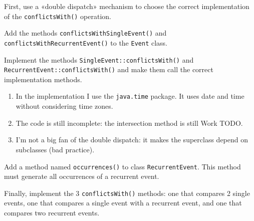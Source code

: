 \documentclass[a4paper,11pt]{memoir}
\newcommand{\code}[1]{\lstinline{#1}}
\begin{document}
\begin{exercise}
	First, use a «double dispatch» mechanism to choose the correct implementation of the \code{conflictsWith()} operation.
	
	\begin{inparaenum}[(A)]
		\item Add the methods \code{conflictsWithSingleEvent()} and \code{conflictsWithRecurrentEvent()} to the \code{Event} class.
		\item Implement the methods \code{SingleEvent::conflictsWith()} and \code{RecurrentEvent::conflictsWith()} and make them call the correct implementation methods.
	\end{inparaenum}
\end{exercise}

\begin{solution}
\begin{enumerate}
	\item In the implementation I use the \code{java.time} package. It uses date and time without considering time zones.
	\item The code is still incomplete: the intersection method is still Work TODO.
	\item I'm not a big fan of the double dispatch: it makes the superclass depend on subclasses (bad practice).
	
\end{enumerate}
\end{solution}

\begin{exercise}
Add a method named \code{occurrences()} to class \code{RecurrentEvent}.
This method must generate all occurrences of a recurrent event. 
\end{exercise}

\begin{solution}






\end{solution}

\begin{exercise}
Finally, implement the 3 \code{conflictsWith()} methods: one that compares 2 single events, one that compares a single event with
a recurrent event, and one that compares two recurrent events.
\end{exercise}
\end{document}
